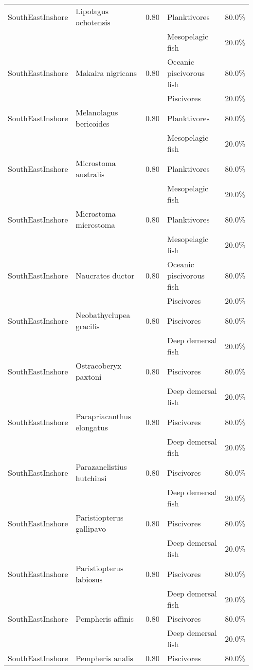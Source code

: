 \begin{longtable}{llcll}
\hline
SouthEastInshore & Lipolagus ochotensis & 0.80 & Planktivores & 80.0\% \\
& & & Mesopelagic fish & 20.0\% \\
\hline
SouthEastInshore & Makaira nigricans & 0.80 & Oceanic piscivorous fish & 80.0\% \\
& & & Piscivores & 20.0\% \\
\hline
SouthEastInshore & Melanolagus bericoides & 0.80 & Planktivores & 80.0\% \\
& & & Mesopelagic fish & 20.0\% \\
\hline
SouthEastInshore & Microstoma australis & 0.80 & Planktivores & 80.0\% \\
& & & Mesopelagic fish & 20.0\% \\
\hline
SouthEastInshore & Microstoma microstoma & 0.80 & Planktivores & 80.0\% \\
& & & Mesopelagic fish & 20.0\% \\
\hline
SouthEastInshore & Naucrates ductor & 0.80 & Oceanic piscivorous fish & 80.0\% \\
& & & Piscivores & 20.0\% \\
\hline
SouthEastInshore & Neobathyclupea gracilis & 0.80 & Piscivores & 80.0\% \\
& & & Deep demersal fish & 20.0\% \\
\hline
SouthEastInshore & Ostracoberyx paxtoni & 0.80 & Piscivores & 80.0\% \\
& & & Deep demersal fish & 20.0\% \\
\hline
SouthEastInshore & Parapriacanthus elongatus & 0.80 & Piscivores & 80.0\% \\
& & & Deep demersal fish & 20.0\% \\
\hline
SouthEastInshore & Parazanclistius hutchinsi & 0.80 & Piscivores & 80.0\% \\
& & & Deep demersal fish & 20.0\% \\
\hline
SouthEastInshore & Paristiopterus gallipavo & 0.80 & Piscivores & 80.0\% \\
& & & Deep demersal fish & 20.0\% \\
\hline
SouthEastInshore & Paristiopterus labiosus & 0.80 & Piscivores & 80.0\% \\
& & & Deep demersal fish & 20.0\% \\
\hline
SouthEastInshore & Pempheris affinis & 0.80 & Piscivores & 80.0\% \\
& & & Deep demersal fish & 20.0\% \\
\hline
SouthEastInshore & Pempheris analis & 0.80 & Piscivores & 80.0\% \\

\end{longtable}
